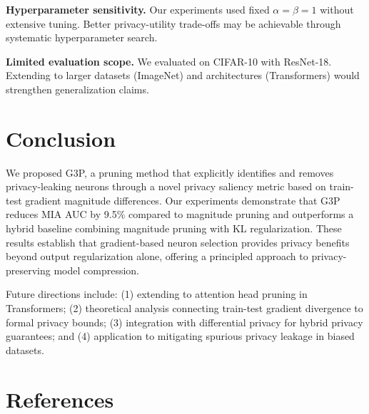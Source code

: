 \documentclass[11pt]{article}
\begin{document}
\textbf{Hyperparameter sensitivity.} Our experiments used fixed $\alpha=\beta=1$ without extensive tuning. Better privacy-utility trade-offs may be achievable through systematic hyperparameter search.

\textbf{Limited evaluation scope.} We evaluated on CIFAR-10 with ResNet-18. Extending to larger datasets (ImageNet) and architectures (Transformers) would strengthen generalization claims.

\section{Conclusion}

We proposed G3P, a pruning method that explicitly identifies and removes privacy-leaking neurons through a novel privacy saliency metric based on train-test gradient magnitude differences. Our experiments demonstrate that G3P reduces MIA AUC by 9.5\% compared to magnitude pruning and outperforms a hybrid baseline combining magnitude pruning with KL regularization. These results establish that gradient-based neuron selection provides privacy benefits beyond output regularization alone, offering a principled approach to privacy-preserving model compression.

Future directions include: (1) extending to attention head pruning in Transformers; (2) theoretical analysis connecting train-test gradient divergence to formal privacy bounds; (3) integration with differential privacy for hybrid privacy guarantees; and (4) application to mitigating spurious privacy leakage in biased datasets.

\section*{References}
\end{document}
